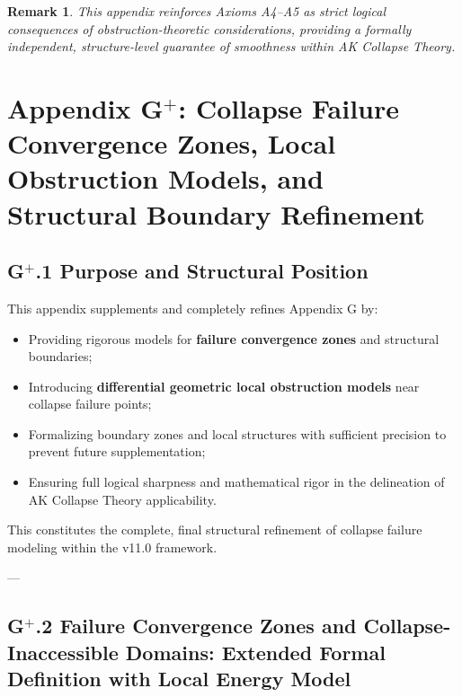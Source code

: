 \documentclass[11pt]{article}
\newtheorem{remark}[theorem]{Remark}
\begin{document}
\begin{remark}
This appendix reinforces Axioms A4–A5 as strict logical consequences of obstruction-theoretic considerations, providing a formally independent, structure-level guarantee of smoothness within AK Collapse Theory.
\end{remark}




\section*{Appendix G$^{+}$: Collapse Failure Convergence Zones, Local Obstruction Models, and Structural Boundary Refinement}

\subsection*{G$^{+}$.1 Purpose and Structural Position}

This appendix supplements and completely refines Appendix G by:

\begin{itemize}
    \item Providing rigorous models for \textbf{failure convergence zones} and structural boundaries;
    \item Introducing \textbf{differential geometric local obstruction models} near collapse failure points;
    \item Formalizing boundary zones and local structures with sufficient precision to prevent future supplementation;
    \item Ensuring full logical sharpness and mathematical rigor in the delineation of AK Collapse Theory applicability.
\end{itemize}

This constitutes the complete, final structural refinement of collapse failure modeling within the v11.0 framework.

---

\subsection*{G$^{+}$.2 Failure Convergence Zones and Collapse-Inaccessible Domains: Extended Formal Definition with Local Energy Model}
\end{document}
